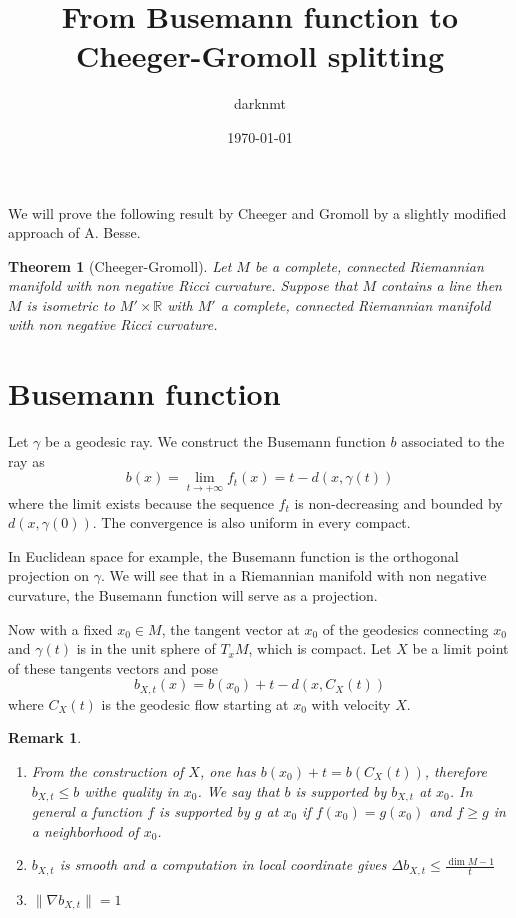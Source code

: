 \documentclass[11pt]{article}
\author{darknmt}
\date{\today}
\title{From Busemann function to Cheeger-Gromoll splitting}
\newtheorem{remark}{Remark}
\newtheorem{theorem}{Theorem}
\begin{document}
\maketitle
\tableofcontents

We will prove the following result by Cheeger and Gromoll by a slightly modified approach of
A. Besse.


\begin{theorem}[Cheeger-Gromoll]
\label{org82ebc3a}
Let \(M\) be a complete, connected Riemannian manifold with non negative Ricci curvature. Suppose
that \(M\) contains a line then \(M\) is isometric to \(M'\times \mathbb{R}\) with \(M'\) a complete,
connected Riemannian manifold with non negative Ricci curvature.
\end{theorem}

\section{Busemann function}
\label{sec:org70bd266}

Let \(\gamma\) be a geodesic ray. We construct the Busemann function \(b\) associated to the ray as
\[
b(x) = \lim_{t\to+\infty}f_t(x) = t - d(x,\gamma(t))
\]
where the limit exists because the sequence \(f_t\) is non-decreasing and bounded by
\(d(x,\gamma(0))\). The convergence is also uniform in every compact. 


In Euclidean space for example, the Busemann function is the orthogonal projection on \(\gamma\). We
will see that in a Riemannian manifold with non negative curvature, the Busemann function will serve
as a projection.


Now with a fixed \(x_0\in M\), the tangent vector at \(x_0\) of the geodesics connecting \(x_0\) and
\(\gamma(t)\) is in the unit sphere of \(T_xM\), which is compact. Let \(X\) be a limit point of these
tangents vectors and pose
\[
b_{X,t}(x) = b(x_0) + t - d(x, C_X(t))
\]
where \(C_X(t)\) is the geodesic flow starting at \(x_0\) with velocity \(X\).

\begin{remark}
\begin{enumerate}
\item From the construction of \(X\), one has \(b(x_0) + t = b(C_X(t))\), therefore \(b_{X,t} \leq b\) withe
quality in \(x_0\). We say that \(b\) is supported by \(b_{X,t}\) at \(x_0\). In general a function \(f\)
is \emph{supported} by \(g\) at \(x_0\) if \(f(x_0)=g(x_0)\) and \(f\geq g\) in a neighborhood of \(x_0\).
\item \(b_{X,t}\) is smooth and a computation in local coordinate gives \(\Delta b_{X,t} \leq \frac{\dim
   M - 1}{t}\)
\item \(\|\nabla b_{X,t}\| = 1\)
\end{enumerate}
\end{remark}
\end{document}
